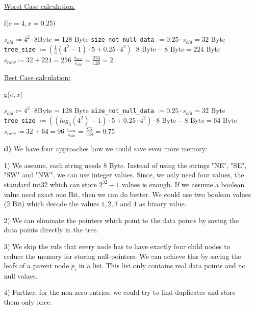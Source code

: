 \documentclass[english, fontsize=12pt, paper=a4, twoside=false, draft=true, pagesize=auto, version=last, DIV=16]{scrartcl}
\theoremstyle{break}
\begin{document}
\underline{Worst Case calculation:} \par
\vspace*{-3mm}
\begin{algorithm}
{f($e=4, x=0.25$)} \par
\begin{algorithmic}[1]
  \State $s_{old} \coloneqq 4^2 \cdot 8$Byte = $128$ Byte
  \State \texttt{size\_not\_null\_data} $\coloneqq 0.25 \cdot s_{old} = 32$ Byte
  \State \texttt{tree\_size} $\coloneqq \left(\frac{1}{3}\left( 4^2 - 1 \right) \cdot 5 + 0.25 \cdot 4^2 \right) \cdot 8 \text{ Byte} - 8 \text{ Byte} = 224$ Byte
  \State $s_{new} \coloneqq 32 + 224 = 256$
    \State \Return $\frac{s_{new}}{s_{old}} = \frac{256}{128} = 2$
\end{algorithmic}
\end{algorithm}\par
\vspace*{3mm}

\underline{Best Case calculation:} \par
\vspace*{-3mm}
\begin{algorithm}
{g($e, x$)} \par
\begin{algorithmic}[1]
  \State $s_{old} \coloneqq 4^2 \cdot 8$Byte = $128$ Byte
  \State \texttt{size\_not\_null\_data} $\coloneqq 0.25 \cdot s_{old} = 32$ Byte
  \State \texttt{tree\_size} $\coloneqq \left( (log_4(4^2) - 1) \cdot 5 + 0.25 \cdot 4^2 \right) \cdot 8 \text{ Byte} - 8 \text{ Byte} = 64 \text{ Byte}$
  \State $s_{new} \coloneqq 32 + 64= 96$
    \State \Return $\frac{s_{new}}{s_{old}} = \frac{96}{128} = 0.75$
\end{algorithmic}
\end{algorithm}\par
\vspace*{15mm}


\textbf{d)}
We have four approaches how we could save even more memory:

1) We assume, each string needs 8 Byte. Instead of using the strings "NE", "SE", "SW" and "NW", we can use integer values. Since, we only need four values, the standard int32 which can store $2^{32}-1$ values is enough. If we assume a boolean value need exact one Bit, then we can do better. We could use two boolean values (2 Bit) which decode the values $1,2,3$ and $4$ as binary value. \par
2) We can eliminate the pointers which point to the data points by saving the data points directly in the tree. \par
3) We skip the rule that every node has to have exactly four child nodes to reduce the memory for storing null-pointers. We can achieve this by saving the leafs of a parent node $p_i$ in a list. This list only contains real data points and no null values. \par
4) Further, for the non-zero-entries, we could try to find duplicates and store them only once. \par
\newpage
\end{document}
